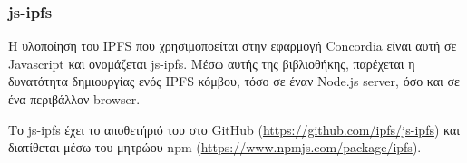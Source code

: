 \subsubsection{js-ipfs} \label{subsection:4-3-4-1-js-ipfs}


H υλοποίηση του IPFS που χρησιμοποείται στην εφαρμογή Concordia είναι αυτή σε Javascript και ονομάζεται js-ipfs. Μέσω αυτής της βιβλιοθήκης, παρέχεται η δυνατότητα δημιουργίας ενός IPFS κόμβου, τόσο σε έναν Node.js server, όσο και σε ένα περιβάλλον browser.

Το js-ipfs έχει το αποθετήριό του στο GitHub (\url{https://github.com/ipfs/js-ipfs}) και διατίθεται μέσω του μητρώου npm (\url{https://www.npmjs.com/package/ipfs}).
